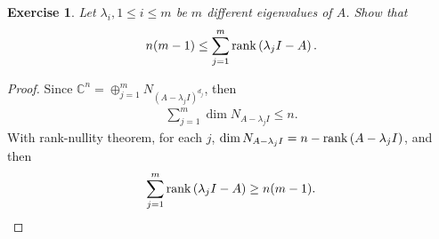 \documentclass[10pt]{book}
\newtheorem{exercise}{Exercise}[section]
\theoremstyle{definition}
\numberwithin{equation}{chapter}
\begin{document}
\medskip

\begin{exercise}
Let $\lambda_i, 1 \leq i \leq m$ be $m$ different eigenvalues of $A$. Show that
\begin{align*}
    n(m - 1) \leq \sum^m_{j=1} \rank \left(\lambda_j I - A\right).
\end{align*}
\end{exercise}
\begin{proof}
Since $\mathbb{C}^n = \oplus^m_{j=1} N_{\left(A - \lambda_j I\right)^{d_j}}$, then 
\begin{align*}
    \sum^m_{j=1} \dim N_{A - \lambda_j I} \leq n.
\end{align*}
With rank-nullity theorem, for each $j$, $\dim N_{A - \lambda_j I} = n - \rank \left(A - \lambda_j I\right)$, and then
\begin{align*}
    \sum^m_{j=1} \rank \left(\lambda_j I - A\right) \geq n(m - 1).
\end{align*}
\end{proof}

\medskip
\end{document}
